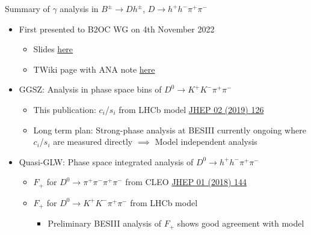 \documentclass{beamer}
\begin{document}
\begin{frame}{Summary of $\gamma$ analysis in $B^\pm\to Dh^\pm$, $D\to h^+h^-\pi^+\pi^-$}
  \vspace{0.5cm}
  \begin{itemize}
    \setlength\itemsep{1.2em}
    \item{First presented to B2OC WG on 4th November 2022}
    \begin{itemize}
      \item{Slides \href{https://indico.cern.ch/event/1085269/\#7-b-dkkpipih}{here}}
      \item{TWiki page with ANA note \href{https://twiki.cern.ch/twiki/bin/view/LHCbPhysics/GGSZB2DhD2hhpipiModelIndependent}{here}}
    \end{itemize}
    \item{GGSZ: Analysis in phase space bins of $D^0\to K^+K^-\pi^+\pi^-$}
    \begin{itemize}
      \item{This publication: $c_i$/$s_i$ from LHCb model \href{https://arxiv.org/abs/1811.08304}{JHEP 02 (2019) 126}}
      \item{Long term plan: Strong-phase analysis at BESIII currently ongoing where $c_i$/$s_i$ are measured directly $\implies$ Model independent analysis}
    \end{itemize}
    \item{Quasi-GLW: Phase space integrated analysis of $D^0\to h^+h^-\pi^+\pi^-$}
    \begin{itemize}
      \item{$F_+$ for $D^0\to\pi^+\pi^-\pi^+\pi^-$ from CLEO \href{https://arxiv.org/abs/1709.03467}{JHEP 01 (2018) 144}}
      \item{$F_+$ for $D^0\to K^+K^-\pi^+\pi^-$ from LHCb model}
      \begin{itemize}
        \item{Preliminary BESIII analysis of $F_+$ shows good agreement with model}
      \end{itemize}
    \end{itemize}
  \end{itemize}
\end{frame}
\end{document}
